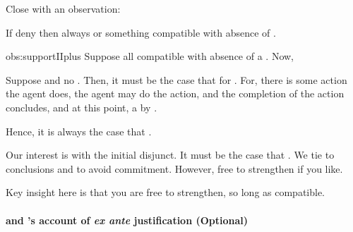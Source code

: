 \begin{note}
  Close with an observation:

  \begin{observation}%
    \label{obs:supportIIplus}%
    If deny \supportII{} then always \pwitP{} or something compatible with absence of \wit{}.
  \end{observation}

  \begin{argument}{obs:supportIIplus}
    Suppose all compatible with absence of a \wit{}.
    Now,

    Suppose \fc{} and no \ros{}.
    Then, it must be the case that \pwitP{} for \ros{}.
    For, there is some action the agent does, the agent may do the action, and the completion of the action concludes, and at this point, a \ros{} by \supportII{}.

    Hence, it is always the case that \pwitP{}.
  \end{argument}

  Our interest is with the initial disjunct.
  It must be the case that \pwitP{}.
  We tie  to conclusions and to avoid commitment.
  However, free to strengthen if you like.

  Key insight here is that you are free to strengthen, so long as compatible.
\end{note}

\paragraph*{\supportII{} and \citeauthor{Goldman:1979ui}'s account of \emph{ex ante} justification \hfill (Optional)}

